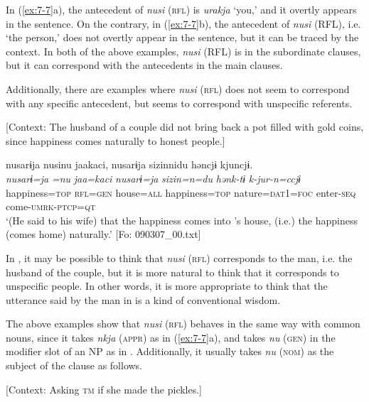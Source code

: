 \z
\z

In (\ref{ex:7-7}a), the antecedent of \textit{nusi} (\textsc{rfl}) is \textit{urakja} ‘you,’ and it overtly appears in the sentence. On the contrary, in (\ref{ex:7-7}b), the antecedent of \textit{nusi} (RFL), i.e. ‘the person,’ does not overtly appear in the sentence, but it can be traced by the context. In both of the above examples, \textit{nusi} (RFL) is in the subordinate clauses, but it can correspond with the antecedents in the main clauses.

  Additionally, there are examples where \textit{nusi} (\textsc{rfl}) does not seem to correspond with any specific antecedent, but seems to correspond with unspecific referents.

\ea \label{ex:7:8}  [Context: The husband of a couple did not bring back a pot filled with gold coins, since happiness comes naturally to honest people.]

{\TM}
\glll nusarɨja  nusinu  jaakaci,  nusarɨja  sizinnidu   həncjɨ  kjuncjɨ.\\
\textit{nusarɨ=ja}  \textit{=nu}  \textit{jaa=kaci}  \textit{nusarɨ=ja}  \textit{sizin=n=du} \textit{hənk-tɨ}  \textit{k-jur-n=ccjɨ}\\
    happiness=\textsc{top}  \textsc{rfl}=\textsc{gen}  house=\textsc{all}  happiness=\textsc{top}  nature=\textsc{dat}1=\textsc{foc}  enter-\textsc{seq}  come-\textsc{umrk}-\textsc{ptcp}=\textsc{qt}\\
\glt    ‘(He said to his wife) that the happiness comes into ’s house, (i.e.) the happiness (comes home) naturally.’ [Fo: 090307\_00.txt]

\z

In , it may be possible to think that \textit{nusi} (\textsc{rfl}) corresponds to the man, i.e. the husband of the couple, but it is more natural to think that it corresponds to unspecific people. In other words, it is more appropriate to think that the utterance said by the man in  is a kind of conventional wisdom.

  The above examples show that \textit{nusi} (\textsc{rfl}) behaves in the same way with common nouns, since it takes \textit{nkja} (\textsc{appr}) as in (\ref{ex:7-7}a), and takes \textit{nu} (\textsc{gen}) in the modifier slot of an NP as in . Additionally, it usually takes \textit{nu} (\textsc{nom}) as the subject of the clause as follows.

\ea \label{ex:7:9}  [Context: Asking \textsc{tm} if she made the pickles.]

